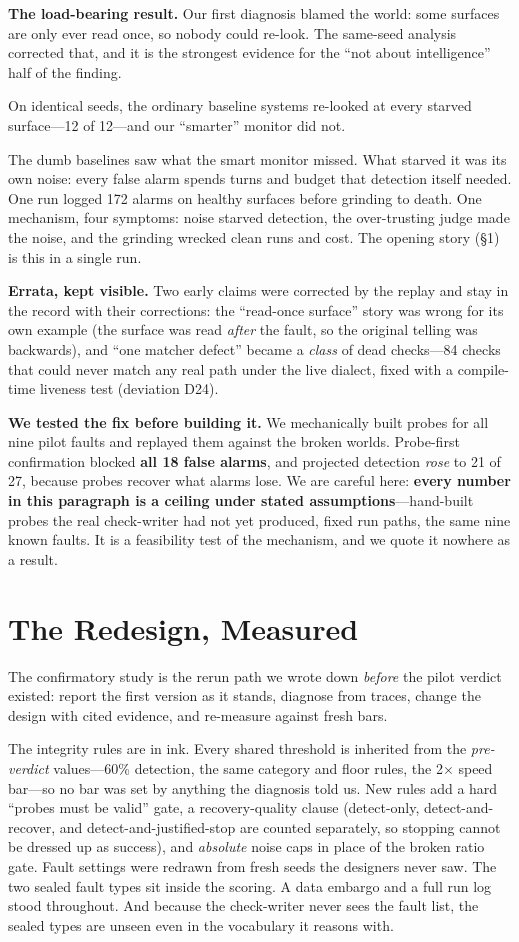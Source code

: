 \documentclass[acmsmall,screen]{acmart}
\begin{document}
\textbf{The load-bearing result.} Our first diagnosis blamed the world: some
surfaces are only ever read once, so nobody could re-look. The same-seed
analysis corrected that, and it is the strongest evidence for the ``not about
intelligence'' half of the finding.

On identical seeds, the ordinary baseline systems re-looked at every starved
surface---12 of 12---and our ``smarter'' monitor did not.

The dumb baselines saw what the smart monitor missed. What starved it was its
own noise: every false alarm spends turns and budget that detection itself
needed. One run logged 172 alarms on healthy surfaces before grinding to death.
One mechanism, four symptoms: noise starved detection, the over-trusting judge
made the noise, and the grinding wrecked clean runs and cost. The opening story
(\S1) is this in a single run.

\textbf{Errata, kept visible.} Two early claims were corrected by the replay and
stay in the record with their corrections: the ``read-once surface'' story was
wrong for its own example (the surface was read \emph{after} the fault, so the
original telling was backwards), and ``one matcher defect'' became a \emph{class}
of dead checks---84 checks that could never match any real path under the live
dialect, fixed with a compile-time liveness test (deviation D24).

\textbf{We tested the fix before building it.} We mechanically built probes for
all nine pilot faults and replayed them against the broken worlds. Probe-first
confirmation blocked \textbf{all 18 false alarms}, and projected detection
\emph{rose} to 21 of 27, because probes recover what alarms lose. We are careful
here: \textbf{every number in this paragraph is a ceiling under stated
assumptions}---hand-built probes the real check-writer had not yet produced,
fixed run paths, the same nine known faults. It is a feasibility test of the
mechanism, and we quote it nowhere as a result.

\section{The Redesign, Measured}
The confirmatory study is the rerun path we wrote down \emph{before} the pilot
verdict existed: report the first version as it stands, diagnose from traces,
change the design with cited evidence, and re-measure against fresh bars.

The integrity rules are in ink. Every shared threshold is inherited from the
\emph{pre-verdict} values---60\% detection, the same category and floor rules,
the 2$\times$ speed bar---so no bar was set by anything the diagnosis told us.
New rules add a hard ``probes must be valid'' gate, a recovery-quality clause
(detect-only, detect-and-recover, and detect-and-justified-stop are counted
separately, so stopping cannot be dressed up as success), and \emph{absolute}
noise caps in place of the broken ratio gate. Fault settings were redrawn from
fresh seeds the designers never saw. The two sealed fault types sit inside the
scoring. A data embargo and a full run log stood throughout. And because the
check-writer never sees the fault list, the sealed types are unseen even in the
vocabulary it reasons with.
\end{document}
